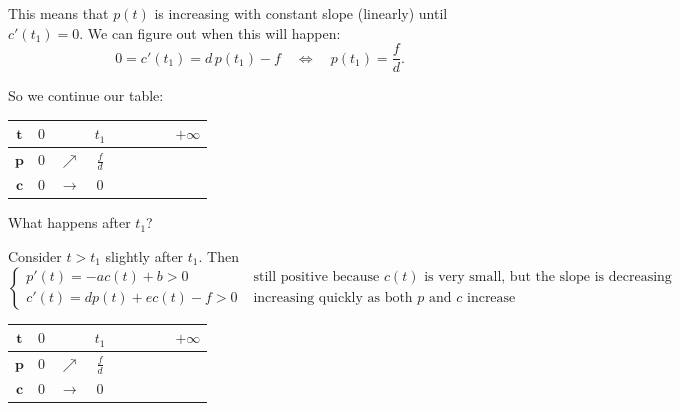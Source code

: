 This means that $p(t)$ is increasing with constant slope (linearly) until $c'(t_1)=0$.
We can figure out when this will happen:
$$
0=c'(t_1)=d\, p(t_1) -f \quad \Leftrightarrow \quad p(t_1) = \frac{f}{d}.
$$

So we continue our table:
\begin{graybox}
\begin{center}
\begin{tabular}{c||c|c|c|c|c|c|c|c}
$\pmb{t}$	& $0$ 		& 			& $t_1$ &  			& 			& 	&	& \hspace{1cm} $+\infty$ \\[5pt] \hline\hline
$\pmb{p}$ & $0$	& $\nearrow$	& $\displaystyle\frac{f}{d}$ &	\hspace{1cm}	&	&  \hspace{0.5cm}	&  	& 	\\[5pt] \hline
$\pmb{c}$ & $0$		& $\rightarrow$	&  0 & \hspace{1cm} & 	\hspace{0.5cm}	& \hspace{1cm} 	& \hspace{0.5cm}	&\hspace{1cm}	\\[5pt]
\end{tabular}
\end{center}
\end{graybox}

What happens after $t_1$?

Consider $t>t_1$ slightly after $t_1$. Then
$$
\begin{cases}
p'(t) = -a c(t) + b >0 & \text{ still positive because $c(t)$ is very small, but the slope is decreasing} \\
c'(t) = d p(t) + e c(t) - f	>0 & \text{ increasing quickly as both $p$ and $c$ increase}
\end{cases}
$$

\begin{graybox}
\begin{center}
\begin{tabular}{c||c|c|c|c|c|c|c|c}
$\pmb{t}$	& $0$ 		& 			& $t_1$ &  			& 			& 	&	& \hspace{1cm} $+\infty$ \\[5pt] \hline\hline
$\pmb{p}$ & $0$	& $\nearrow$	& $\displaystyle\frac{f}{d}$ &	\IncDown	&	&  \hspace{1cm}	&  	& 	\\[5pt] \hline
$\pmb{c}$ & $0$		& $\rightarrow$	&  0 & \IncUp & 	\hspace{0.5cm}	& \hspace{1cm} 	& \hspace{0.5cm}	&\hspace{1cm}	\\[5pt]
\end{tabular}
\end{center}
\end{graybox}

